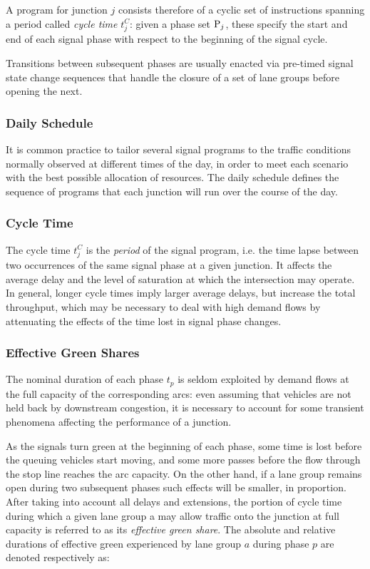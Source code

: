 A program for junction $j$ consists therefore of a cyclic set of instructions spanning a period called \emph{cycle time} $t_j^C$: given a phase set $\mathrm{P}_j$, these specify the start and end of each signal phase with respect to the beginning of the signal cycle.

Transitions between subsequent phases are usually enacted via pre-timed signal state change sequences that handle the closure of a set of lane groups before opening the next.

\subsubsection{Daily Schedule}
It is common practice to tailor several signal programs to the traffic conditions normally
observed at different times of the day, in order to meet each scenario with the best possible
allocation of resources. The daily schedule defines the sequence of programs that each
junction will run over the course of the day.

\subsubsection{Cycle Time}
The cycle time $t_j^C$ is the \emph{period} of the signal program, i.e. the time lapse between two occurrences of the same signal phase at a given junction.
It affects the average delay and the level of saturation at which the intersection may operate. In general, longer cycle times imply larger average delays, but increase the total throughput, which may be necessary to deal with high demand flows by attenuating the effects of the time lost in signal phase changes.

\subsubsection{Effective Green Shares}
The nominal duration of each phase $t_p$ is seldom exploited by demand flows at the full
capacity of the corresponding arcs: even assuming that vehicles are not held back by
downstream congestion, it is necessary to account for some transient phenomena affecting the
performance of a junction.

As the signals turn green at the beginning of each phase, some time is lost before the
queuing vehicles start moving, and some more passes before the flow through the stop line reaches the arc capacity.
On the other hand, if a lane group remains open during two subsequent phases such effects will be smaller, in proportion.
After taking into account all delays and extensions, the portion of cycle time during
which a given lane group a may allow traffic onto the junction at full capacity is referred to as
its \emph{effective green share}.
The absolute and relative durations of effective green experienced by lane group $a$ during phase $p$ are denoted respectively as:

